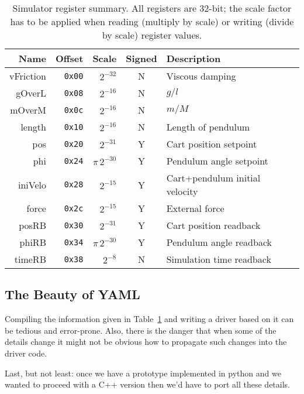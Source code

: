 \documentclass[10pt]{article}
\newcommand{\py}        {python}
\newcommand{\cpp}       {C++}
\newcommand{\cod}[1] {{\tt#1}}
\newcounter{tbls}
\begin{document}
\begin{table}[ht]
\label{tbl:regs}
\hspace*{\fill}
\begin{tabular}{rrrcl}
         Name &     Offset & Scale        & Signed & Description       \\
\hline
    vFriction & \cod{0x00} & $2^{-32}$    & N & Viscous damping   \\
       gOverL & \cod{0x08} & $2^{-16}$    & N & $g/l$             \\
       mOverM & \cod{0x0c} & $2^{-16}$    & N & $m/M$             \\
       length & \cod{0x10} & $2^{-16}$    & N & Length of pendulum\\
          pos & \cod{0x20} & $2^{-31}$    & Y & Cart position setpoint\\
          phi & \cod{0x24} & $\pi\, 2^{-30}$& Y & Pendulum angle setpoint\\
      iniVelo & \cod{0x28} & $2^{-15}$    & Y & Cart+pendulum initial velocity\\
        force & \cod{0x2c} & $2^{-15}$    & Y & External force\\
\hline
        posRB & \cod{0x30} & $2^{-31}$    & Y & Cart position readback\\
        phiRB & \cod{0x34} & $\pi\, 2^{-30}$& Y & Pendulum angle readback\\
       timeRB & \cod{0x38} & $2^{-8}$     & N & Simulation time readback\\
\end{tabular}
\hspace*{\fill}
\caption{Simulator register summary. All registers are 32-bit; the scale factor has
to be applied when reading (multiply by scale) or writing (divide by scale) register
values.}
\end{table}

\subsection{The Beauty of YAML}
Compiling the information given in Table~\ref{tbl:regs} and writing a driver based
on it can be tedious and error-prone. Also, there is the danger that when some of
the details change it might not be obvious how to propagate such changes into the
driver code.

Last, but not least: once we have a prototype implemented in \py{} and we wanted
to proceed with a \cpp{} version then we'd have to port all these details.
\end{document}
